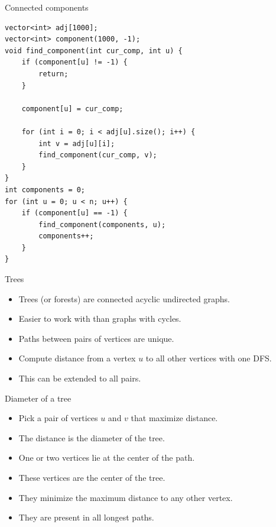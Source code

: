 \documentclass{beamer}
\begin{document}
\begin{frame}{Connected components}
    \begin{verbatim}
vector<int> adj[1000];
vector<int> component(1000, -1);
void find_component(int cur_comp, int u) {
    if (component[u] != -1) {
        return;
    }

    component[u] = cur_comp;

    for (int i = 0; i < adj[u].size(); i++) {
        int v = adj[u][i];
        find_component(cur_comp, v);
    }
}
int components = 0;
for (int u = 0; u < n; u++) {
    if (component[u] == -1) {
        find_component(components, u);
        components++;
    }
}
    \end{verbatim}
\end{frame}

\begin{frame}[plain]{Trees}
    \begin{itemize}
        \item Trees (or forests) are connected acyclic undirected graphs.
        \item Easier to work with than graphs with cycles.
        \item Paths between pairs of vertices are unique.
        \item Compute distance from a vertex $u$ to all other vertices with one DFS.
        \item This can be extended to all pairs.
    \end{itemize}
\end{frame}

\begin{frame}[plain]{Diameter of a tree}
    \begin{itemize}
        \item Pick a pair of vertices $u$ and $v$ that maximize distance.
        \item The distance is the diameter of the tree.
        \item One or two vertices lie at the center of the path.
        \item These vertices are the center of the tree.
        \item They minimize the maximum distance to any other vertex.
        \item They are present in all longest paths.
    \end{itemize}
\end{frame}
\end{document}
